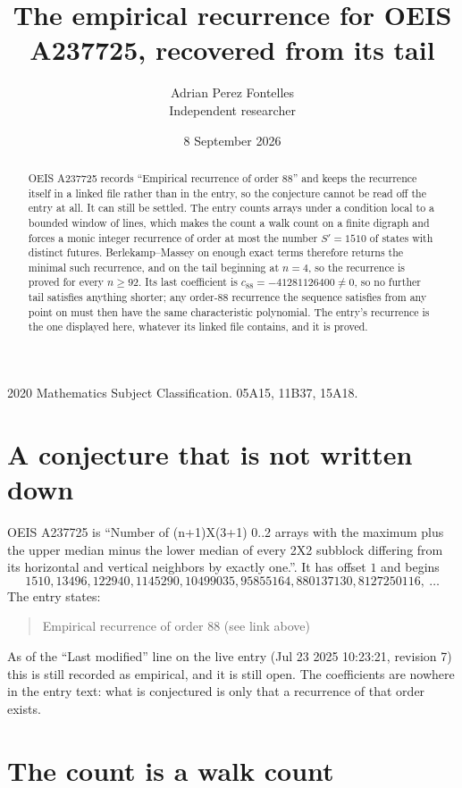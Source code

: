 \documentclass[11pt,a4paper]{article}
\title{The empirical recurrence for OEIS A237725, recovered from its tail}
\author{Adrian Perez Fontelles\\ \small Independent researcher}
\date{8 September 2026}
\theoremstyle{plain}
\theoremstyle{definition}
\begin{document}
\maketitle

\begin{abstract}
OEIS A237725 records ``Empirical recurrence of order $88$'' and keeps the recurrence itself in
a linked file rather than in the entry, so the conjecture cannot be read off the entry at all.
It can still be settled. The entry counts arrays under a condition local to a bounded window of
lines, which makes the count a walk count on a finite digraph and forces a monic integer
recurrence of order at most the number $S'=1510$ of states with distinct futures. Berlekamp--Massey on
enough exact terms therefore returns the minimal such recurrence, and on the tail beginning at $n=4$, so the recurrence is proved for every $n\ge92$.
Its last coefficient is $c_{88}=-41281126400\neq0$, so no further tail satisfies anything
shorter; any order-$88$ recurrence the sequence satisfies from any point on must then have
the same characteristic polynomial. The entry's recurrence is the one displayed here, whatever
its linked file contains, and it is proved.
\end{abstract}

\noindent\small 2020 Mathematics Subject Classification. 05A15, 11B37, 15A18.\normalsize

\section{A conjecture that is not written down}

OEIS A237725 is ``Number of (n+1)X(3+1) 0..2 arrays with the maximum plus the upper median minus the lower median of every 2X2 subblock differing from its horizontal and vertical neighbors by exactly one.''. It has offset $1$ and begins
\[
1510, 13496, 122940, 1145290, 10499035, 95855164, 880137130, 8127250116,\ \dots
\]
The entry states:
\begin{quote}
Empirical recurrence of order 88 (see link above)
\end{quote}
As of the ``Last modified'' line on the live entry (Jul 23 2025 10:23:21, revision 7)
this is still recorded as empirical, and it is still open. The coefficients are nowhere in the
entry text: what is conjectured is only that a recurrence of that order exists.

\section{The count is a walk count}
\end{document}
